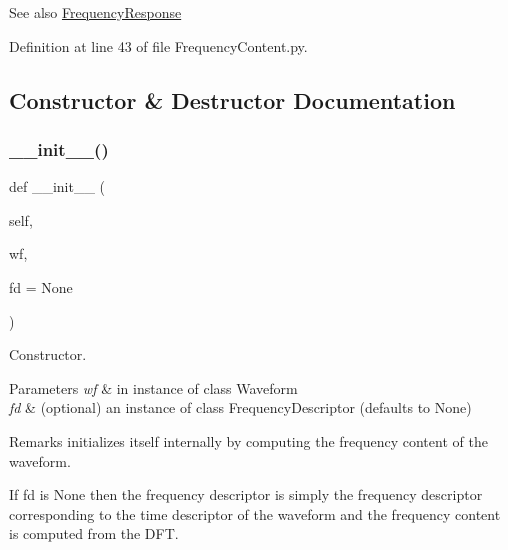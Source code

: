 \begin{DoxySeeAlso}{See also}
\hyperlink{namespaceSignalIntegrity_1_1FrequencyDomain_1_1FrequencyResponse}{Frequency\+Response} 
\end{DoxySeeAlso}


Definition at line 43 of file Frequency\+Content.\+py.



\subsection{Constructor \& Destructor Documentation}
\mbox{\label{classSignalIntegrity_1_1FrequencyDomain_1_1FrequencyContent_1_1FrequencyContent_a6206b0356859e0b87ba95eefb298c2bf}} 
\subsubsection{\texorpdfstring{\+\_\+\+\_\+init\+\_\+\+\_\+()}{\_\_init\_\_()}}
{\footnotesize\ttfamily def \+\_\+\+\_\+init\+\_\+\+\_\+ (\begin{DoxyParamCaption}\item[{}]{self,  }\item[{}]{wf,  }\item[{}]{fd = {\ttfamily None} }\end{DoxyParamCaption})}



Constructor. 


\begin{DoxyParams}{Parameters}
{\em wf} & in instance of class Waveform \\
\hline
{\em fd} & (optional) an instance of class Frequency\+Descriptor (defaults to None) \\
\hline
\end{DoxyParams}
\begin{DoxyRemark}{Remarks}
initializes itself internally by computing the frequency content of the waveform.
\end{DoxyRemark}
If fd is None then the frequency descriptor is simply the frequency descriptor corresponding to the time descriptor of the waveform and the frequency content is computed from the D\+FT.

